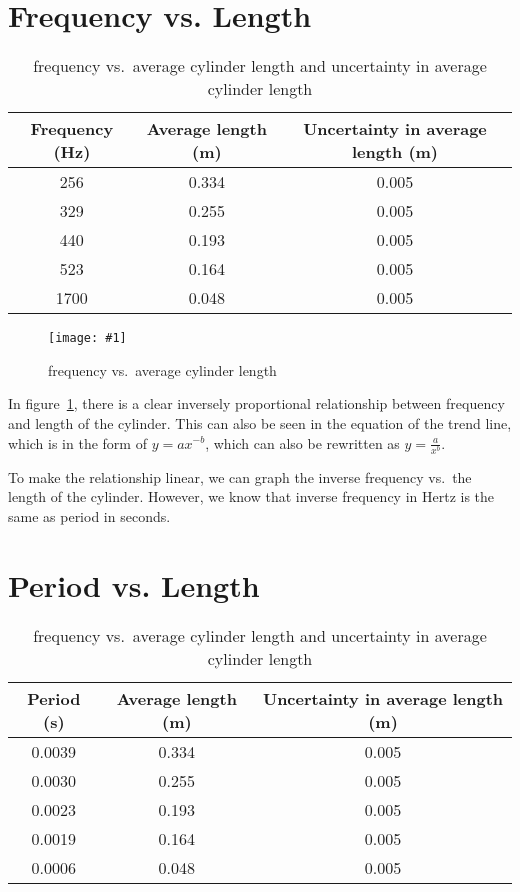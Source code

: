 \documentclass{article}
\newcommand{\graph}[2]{
  \begin{figure}[H]
    \medskip
    \centering
    \texttt{[image: \#1]}
    \caption{#2}
    \medskip\label{fig:#1}
  \end{figure}
}
\begin{document}
\section{Frequency vs. Length}\label{sec:freq-vs-length}

\begin{table}[H]
  \centering
  \begin{tabular}{@{}ccc@{}}
    \toprule
    Frequency (Hz) & Average length (m) & Uncertainty in average
    length (m) \\
    \midrule
    256 & 0.334 & 0.005 \\
    329 & 0.255 & 0.005 \\
    440 & 0.193 & 0.005 \\
    523 & 0.164 & 0.005 \\
    1700 & 0.048 & 0.005 \\
    \bottomrule
  \end{tabular}
  \caption{frequency vs.\ average cylinder length and uncertainty in
  average cylinder length}\label{tab:freq-vs-length}
\end{table}

\graph{freq-vs-length}{frequency vs.\ average cylinder length}

In figure~\ref{fig:freq-vs-length}, there is a clear inversely proportional
relationship between frequency and length of the cylinder. This can
also be seen in the equation of the trend line, which is in the form
of \(y=ax^{-b}\), which can also be rewritten as \(y=\frac{a}{x^b}\).

To make the relationship linear, we can graph the inverse frequency
vs.\ the length of the cylinder. However, we know that inverse
frequency in Hertz is the same as period in seconds.

\section{Period vs. Length}

\begin{table}[H]
  \centering
  \begin{tabular}{@{}ccc@{}}
    \toprule
    Period (s) & Average length (m) & Uncertainty in average length (m) \\
    \midrule
    0.0039 & 0.334 & 0.005 \\
    0.0030 & 0.255 & 0.005 \\
    0.0023 & 0.193 & 0.005 \\
    0.0019 & 0.164 & 0.005 \\
    0.0006 & 0.048 & 0.005 \\
    \bottomrule
  \end{tabular}
  \caption{frequency vs.\ average cylinder length and uncertainty in
  average cylinder length}\label{tab:period-vs-length}
\end{table}
\end{document}
